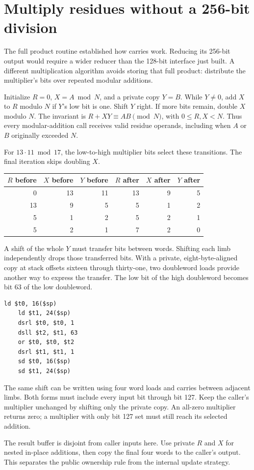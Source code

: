\section{Multiply residues without a 256-bit division}
The full product routine established how carries work. Reducing its 256-bit output
would require a wider reducer than the 128-bit interface just built. A different
multiplication algorithm avoids storing that full product: distribute the multiplier's
bits over repeated modular additions.

Initialize \(R=0\), \(X=A\bmod N\), and a private copy \(Y=B\). While \(Y\ne0\),
add \(X\) to \(R\) modulo \(N\) if \(Y\)'s low bit is one. Shift \(Y\) right.
If more bits remain, double \(X\) modulo \(N\). The invariant is
\(R+XY\equiv AB\pmod N\), with \(0\leq R,X<N\). Thus every modular-addition call
receives valid residue operands, including when \(A\) or \(B\) originally exceeded
\(N\).

For \(13\cdot11\bmod17\), the low-to-high multiplier bits select these transitions.
The final iteration skips doubling \(X\).
\begin{center}
\begin{tabular}{rrrrrr}
\(R\) before & \(X\) before & \(Y\) before & \(R\) after & \(X\) after & \(Y\) after \\
\hline
0 & 13 & 11 & 13 & 9 & 5 \\
13 & 9 & 5 & 5 & 1 & 2 \\
5 & 1 & 2 & 5 & 2 & 1 \\
5 & 2 & 1 & 7 & 2 & 0 \\
\end{tabular}
\end{center}

A shift of the whole \(Y\) must transfer bits between words. Shifting each limb
independently drops those transferred bits. With a private, eight-byte-aligned copy
at stack offsets sixteen through thirty-one, two doubleword loads provide another
way to express the transfer. The low bit of the high doubleword becomes bit 63 of
the low doubleword.

\begin{verbatim}
ld $t0, 16($sp)
    ld $t1, 24($sp)
    dsrl $t0, $t0, 1
    dsll $t2, $t1, 63
    or $t0, $t0, $t2
    dsrl $t1, $t1, 1
    sd $t0, 16($sp)
    sd $t1, 24($sp)
\end{verbatim}

The same shift can be written using four word loads and carries between adjacent
limbs. Both forms must include every input bit through bit 127. Keep the caller's
multiplier unchanged by shifting only the private copy. An all-zero multiplier returns
zero; a multiplier with only bit 127 set must still reach its selected addition.

The result buffer is disjoint from caller inputs here. Use private \(R\) and \(X\)
for nested in-place additions, then copy the final four words to the caller's output.
This separates the public ownership rule from the internal update strategy.
